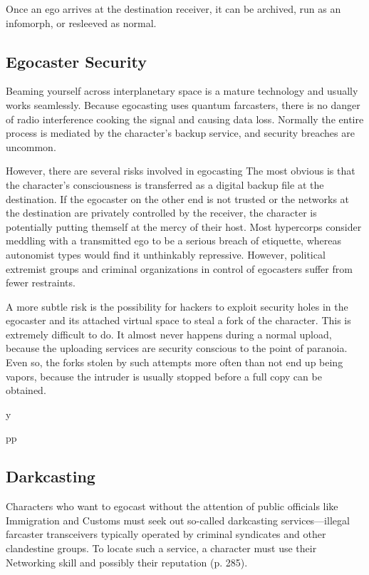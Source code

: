 Once an ego arrives at the destination receiver, it can 
be archived, run as an infomorph, or resleeved as normal.

\subsection{Egocaster Security}

Beaming yourself across interplanetary space is a 
mature technology and usually works seamlessly. Because
egocasting uses quantum farcasters, there is no
danger of radio interference cooking the signal and 
causing data loss. Normally the entire process is mediated
by the character's backup service, and security
breaches are uncommon.

However, there are several risks involved in egocasting
The most obvious is that the character's consciousness
is transferred as a digital backup file at the
destination. If the egocaster on the other end is not 
trusted or the networks at the destination are privately 
controlled by the receiver, the character is potentially 
putting themself at the mercy of their host. Most hypercorps
consider meddling with a transmitted ego to
be a serious breach of etiquette, whereas autonomist 
types would find it unthinkably repressive. However, 
political extremist groups and criminal organizations 
in control of egocasters suffer from fewer restraints.

A more subtle risk is the possibility for hackers to 
exploit security holes in the egocaster and its attached 
virtual space to steal a fork of the character. This is 
extremely difficult to do. It almost never happens 
during a normal upload, because the uploading services
are security conscious to the point of paranoia.
Even so, the forks stolen by such attempts more often 
than not end up being vapors, because the intruder 
is usually stopped before a full copy can be obtained.

y

pp

\subsection{Darkcasting}

Characters who want to egocast without the attention
of public officials like Immigration and Customs
must seek out so-called darkcasting services—illegal 
farcaster transceivers typically operated by criminal 
syndicates and other clandestine groups. To locate 
such a service, a character must use their Networking 
skill and possibly their reputation (p. 285).

